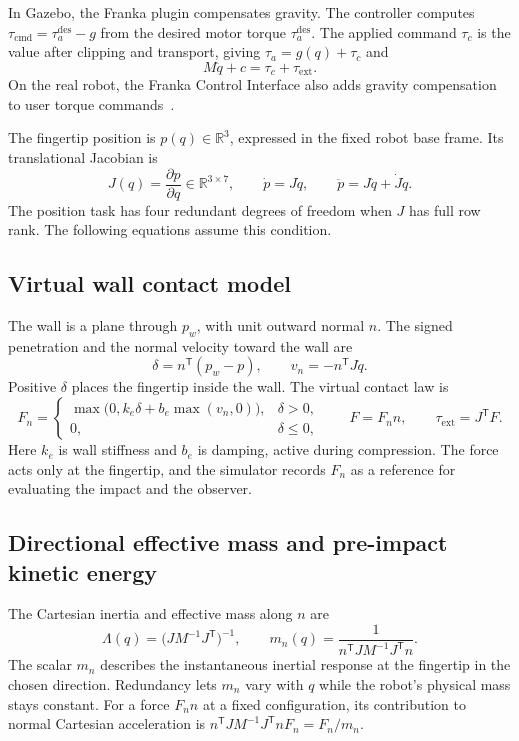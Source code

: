 \documentclass[11pt,a4paper]{article}
\begin{document}
In Gazebo, the Franka plugin compensates gravity. The controller computes
$\tau_{\mathrm{cmd}}=\tau_a^{\mathrm{des}}-g$ from the desired motor torque
$\tau_a^{\mathrm{des}}$. The applied command $\tau_c$ is the value after
clipping and transport, giving $\tau_a=g(q)+\tau_c$ and
\begin{equation}
 M\ddot q+c=\tau_c+\tau_{\mathrm{ext}}.
 \label{eq:compensated}
\end{equation}
On the real robot, the Franka Control Interface also adds gravity
compensation to user torque commands~\cite{franka-fci}.

The fingertip position is $p(q)\in\mathbb R^3$, expressed in the fixed robot
base frame. Its translational Jacobian is
\begin{equation}
 J(q)=\frac{\partial p}{\partial q}\in\mathbb R^{3\times7},
 \qquad \dot p=J\dot q,\qquad
 \ddot p=J\ddot q+\dot J\dot q .
 \label{eq:kinematics}
\end{equation}
The position task has four redundant degrees of freedom when $J$ has full
row rank. The following equations assume this condition.

\subsection{Virtual wall contact model}
The wall is a plane through $p_w$, with unit outward normal $n$. The signed
penetration and the normal velocity toward the wall are
\begin{equation}
 \delta=n^{\mathsf T}(p_w-p),\qquad v_n=-n^{\mathsf T}J\dot q .
\end{equation}
Positive $\delta$ places the fingertip inside the wall. The virtual contact law is
\begin{equation}
 F_n=
 \begin{cases}
 \max\!\bigl(0,k_e\delta+b_e\max(v_n,0)\bigr),&\delta>0,\\
 0,&\delta\le0,
 \end{cases}
 \qquad F=F_n n,\qquad \tau_{\mathrm{ext}}=J^{\mathsf T}F .
 \label{eq:wall}
\end{equation}
Here $k_e$ is wall stiffness and $b_e$ is damping, active during compression.
The force acts only at the fingertip, and the simulator records $F_n$ as a
reference for evaluating the impact and the observer.

\subsection{Directional effective mass and pre-impact kinetic energy}
The Cartesian inertia and effective mass along $n$ are
\begin{equation}
 \Lambda(q)=\bigl(JM^{-1}J^{\mathsf T}\bigr)^{-1},\qquad
 m_n(q)=\frac{1}{n^{\mathsf T}JM^{-1}J^{\mathsf T}n}.
 \label{eq:mass}
\end{equation}
The scalar $m_n$ describes the instantaneous inertial response at the
fingertip in the chosen direction. Redundancy lets $m_n$ vary with $q$
while the robot's physical mass stays constant.
For a force $F_n n$ at a fixed configuration, its contribution to normal
Cartesian acceleration is
$n^{\mathsf T}JM^{-1}J^{\mathsf T}nF_n=F_n/m_n$.
\end{document}
